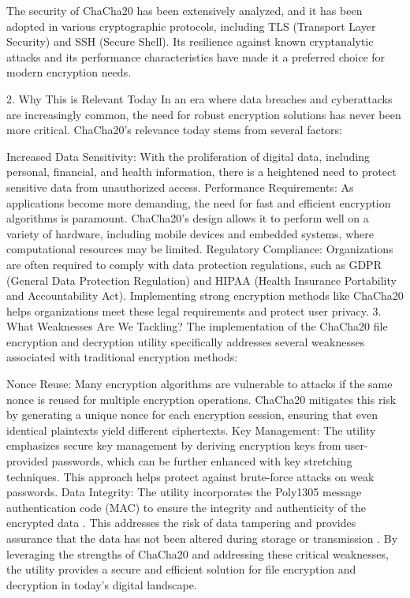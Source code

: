 \documentclass[a4paper,12pt]{report}
\begin{document}
The security of ChaCha20 has been extensively analyzed, and it has been adopted in various cryptographic protocols, including TLS (Transport Layer Security) and SSH (Secure Shell).
Its resilience against known cryptanalytic attacks and its performance characteristics have made it a preferred choice for modern encryption needs.

2.
Why This is Relevant Today
In an era where data breaches and cyberattacks are increasingly common, the need for robust encryption solutions has never been more critical.
ChaCha20's relevance today stems from several factors:

Increased Data Sensitivity: With the proliferation of digital data, including personal, financial, and health information, there is a heightened need to protect sensitive data from unauthorized access.
Performance Requirements: As applications become more demanding, the need for fast and efficient encryption algorithms is paramount.
ChaCha20's design allows it to perform well on a variety of hardware, including mobile devices and embedded systems, where computational resources may be limited.
Regulatory Compliance: Organizations are often required to comply with data protection regulations, such as GDPR (General Data Protection Regulation) and HIPAA (Health Insurance Portability and Accountability Act).
Implementing strong encryption methods like ChaCha20 helps organizations meet these legal requirements and protect user privacy.
3.
What Weaknesses Are We Tackling?
The implementation of the ChaCha20 file encryption and decryption utility specifically addresses several weaknesses associated with traditional encryption methods:

Nonce Reuse: Many encryption algorithms are vulnerable to attacks if the same nonce is reused for multiple encryption operations.
ChaCha20 mitigates this risk by generating a unique nonce for each encryption session, ensuring that even identical plaintexts yield different ciphertexts.
Key Management: The utility emphasizes secure key management by deriving encryption keys from user-provided passwords, which can be further enhanced with key stretching techniques.
This approach helps protect against brute-force attacks on weak passwords.
Data Integrity: The utility incorporates the Poly1305 message authentication code (MAC) to ensure the integrity and authenticity of the encrypted data \cite{de2017chacha20}.
This addresses the risk of data tampering and provides assurance that the data has not been altered during storage or transmission \cite{degabriele2021security}.
By leveraging the strengths of ChaCha20 and addressing these critical weaknesses, the utility provides a secure and efficient solution for file encryption and decryption in today's digital landscape.
\end{document}
